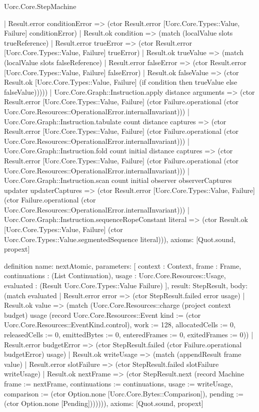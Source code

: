 \begin{lexlean}{Uorc.Core.StepMachine}
\begin{semanticmodule}
{      | Result.error conditionError => (ctor Result.error [Uorc.Core.Types::Value, Failure] conditionError)
      | Result.ok condition => (match (localValue slots trueReference)
        | Result.error trueError => (ctor Result.error [Uorc.Core.Types::Value, Failure] trueError)
        | Result.ok trueValue => (match (localValue slots falseReference)
          | Result.error falseError => (ctor Result.error [Uorc.Core.Types::Value, Failure] falseError)
          | Result.ok falseValue => (ctor Result.ok [Uorc.Core.Types::Value, Failure] (if condition then trueValue else falseValue)))))
    | Uorc.Core.Graph::Instruction.apply distance arguments => (ctor Result.error [Uorc.Core.Types::Value, Failure] (ctor Failure.operational (ctor Uorc.Core.Resources::OperationalError.internalInvariant)))
    | Uorc.Core.Graph::Instruction.tabulate count distance captures => (ctor Result.error [Uorc.Core.Types::Value, Failure] (ctor Failure.operational (ctor Uorc.Core.Resources::OperationalError.internalInvariant)))
    | Uorc.Core.Graph::Instruction.fold count initial distance captures => (ctor Result.error [Uorc.Core.Types::Value, Failure] (ctor Failure.operational (ctor Uorc.Core.Resources::OperationalError.internalInvariant)))
    | Uorc.Core.Graph::Instruction.scan count initial observer observerCaptures updater updaterCaptures => (ctor Result.error [Uorc.Core.Types::Value, Failure] (ctor Failure.operational (ctor Uorc.Core.Resources::OperationalError.internalInvariant)))
    | Uorc.Core.Graph::Instruction.sequenceRopeConstant literal => (ctor Result.ok [Uorc.Core.Types::Value, Failure] (ctor Uorc.Core.Types::Value.segmentedSequence literal))),
  axioms: [Quot.sound, propext]
}

definition{
  name: nextAtomic,
  parameters: [
    context : Context,
    frame : Frame,
    continuations : (List Continuation),
    usage : Uorc.Core.Resources::Usage,
    evaluated : (Result Uorc.Core.Types::Value Failure)
  ],
  result: StepResult,
  body: (match evaluated
    | Result.error error => (ctor StepResult.failed error usage)
    | Result.ok value => (match (Uorc.Core.Resources::charge (project context budget) usage (record Uorc.Core.Resources::Event {kind := (ctor Uorc.Core.Resources::EventKind.control), work := 128, allocatedCells := 0, releasedCells := 0, emittedBytes := 0, enteredFrames := 0, exitedFrames := 0}))
      | Result.error budgetError => (ctor StepResult.failed (ctor Failure.operational budgetError) usage)
      | Result.ok writeUsage => (match (appendResult frame value)
        | Result.error slotFailure => (ctor StepResult.failed slotFailure writeUsage)
        | Result.ok nextFrame => (ctor StepResult.next (record Machine {frame := nextFrame, continuations := continuations, usage := writeUsage, comparison := (ctor Option.none [Uorc.Core.Bytes::Comparison]), pending := (ctor Option.none [Pending])}))))),
  axioms: [Quot.sound, propext]
}


\end{semanticmodule}
\end{lexlean}
